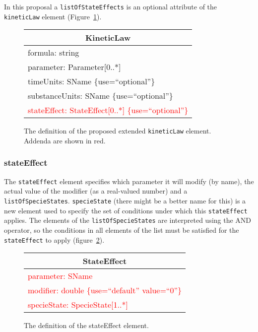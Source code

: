 \documentclass{cekarticle}
\begin{document}
In this proposal a \texttt{listOfStateEffects} is an optional
attribute of the \texttt{kineticLaw} element
(Figure~\ref{fig:kineticlaw}).

\begin{figure}[h]
  \vspace*{8pt}
  \centering
  \begin{tabular}{|l|}
    \hline
    \multicolumn{1}{|c|}{\rule[-3mm]{0mm}{8mm}{\textsf{KineticLaw}}}\\
    \hline
    \rule[0mm]{0mm}{5mm}{\textsf{\small formula: string}}\\
    \textsf{\small parameter: Parameter[0..*]} \\
    \textsf{\small timeUnits: SName \{use=``optional''\}}\\
    \textsf{\small substanceUnits: SName \{use=``optional''\}}\\
    \rule[-3mm]{0mm}{5mm}{\textsf{\small \textcolor{red}{stateEffect: StateEffect[0..*] \{use=``optional''\}}}}\\
    \hline
  \end{tabular}
  \caption{The definition of the proposed extended \texttt{kineticLaw} element. Addenda are shown in red.}
  \label{fig:kineticlaw}
\end{figure}

\subsubsection{stateEffect}\label{sec:stateeffect}

The \texttt{stateEffect} element specifies which parameter it will modify (by
name), the actual value of the modifier (as a real-valued number) and a
\texttt{listOfSpecieStates}.  \texttt{specieState} (there might be a better name
for this) is a new element used to specify the set of conditions under which
this \texttt{stateEffect} applies.  The elements of the
\texttt{listOfSpecieStates} are interpreted using the AND operator, so the
conditions in all elements of the list must be satisfied for the
\texttt{stateEffect} to apply (figure~\ref{fig:stateeffect}).

\begin{figure}[h]
  \vspace*{8pt}
  \centering
  \textcolor{red}{%
  \begin{tabular}{|l|}
    \hline
    \multicolumn{1}{|c|}{\rule[-3mm]{0mm}{8mm}{\textsf{StateEffect}}}\\
    \hline
    \rule[0mm]{0mm}{5mm}{\textsf{\small \textcolor{red}{parameter: SName }}}\\
    \textsf{\small \textcolor{red}{modifier: double \{use=``default'' value=``0''\}}}\\
    \rule[-3mm]{0mm}{5mm}{\textsf{\small \textcolor{red}{specieState: SpecieState[1..*] }}}\\
    \hline
  \end{tabular}
}
  \caption{The definition of the stateEffect element.}
  \label{fig:stateeffect}
\end{figure}
\end{document}
